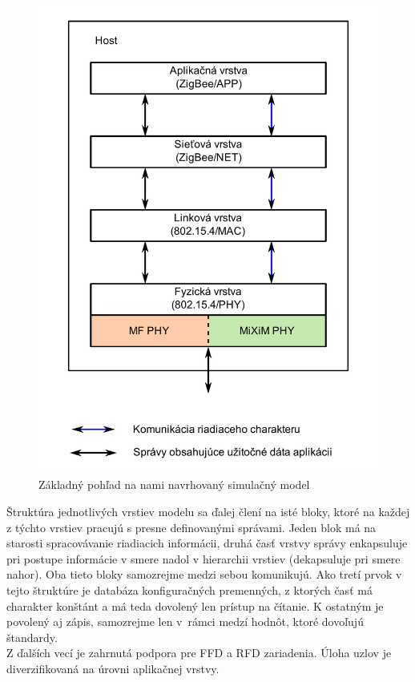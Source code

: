 \begin{figure}[htbp]
\begin{center}
\includegraphics[width=120mm]{figures/architecture_model}
\caption{Základný pohľad na nami navrhovaný simulačný model}
\label{fig:architecture_model}
\end{center}
\end{figure}
\indent\indent Štruktúra jednotlivých vrstiev modelu sa ďalej člení na isté bloky, ktoré na každej z týchto vrstiev pracujú s presne definovanými správami. Jeden blok má na starosti spracovávanie riadiacich informácii, druhá časť vrstvy správy enkapsuluje pri postupe informácie v smere nadol v hierarchii vrstiev (dekapsuluje pri smere nahor). Oba tieto bloky samozrejme medzi sebou komunikujú. Ako tretí prvok v tejto štruktúre je databáza konfiguračných premenných, z ktorých časť má charakter konštánt a má teda dovolený len prístup na čítanie. K ostatným je povolený aj zápis, samozrejme len v~rámci medzí hodnôt, ktoré dovoľujú štandardy.\\
\indent Z ďalších vecí je zahrnutá podpora pre FFD a RFD zariadenia. Úloha uzlov je diverzifikovaná na úrovni aplikačnej vrstvy.\\

